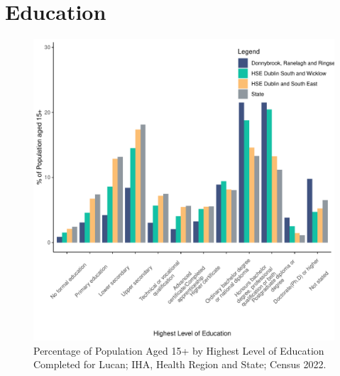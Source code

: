 \documentclass{article}
\begin{document}
\section{Education}\label{sect:Edu}
\begin{figure}[H]
	\centering
	\includegraphics[width = 120mm]{../figures/EduED.pdf}
	\caption{Percentage of Population Aged 15+ by Highest Level of Education Completed for Lucan; IHA, Health Region and State; Census 2022.}
	\label{fig:vbnv}
	\end{figure}
\end{document}
